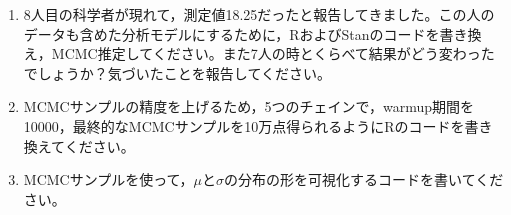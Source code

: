 \begin{enumerate}
	\item 8人目の科学者が現れて，測定値18.25だったと報告してきました。この人のデータも含めた分析モデルにするために，RおよびStanのコードを書き換え，MCMC推定してください。また7人の時とくらべて結果がどう変わったでしょうか？気づいたことを報告してください。
	\item MCMCサンプルの精度を上げるため，5つのチェインで，warmup期間を10000，最終的なMCMCサンプルを10万点得られるようにRのコードを書き換えてください。
	\item MCMCサンプルを使って，$\mu$と$\sigma$の分布の形を可視化するコードを書いてください。
\end{enumerate}
